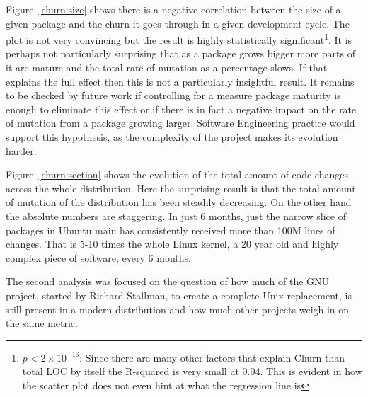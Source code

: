 \documentclass[11pt]{article}
\begin{document}
Figure~\ref{churn:size} shows there is a negative correlation between the size of a given package and the churn it goes through in a given development cycle. The plot is not very convincing but the result is highly statistically significant\footnote{$p < 2 \times 10^{-16}$; Since there are many other factors that explain Churn than total LOC by itself the R-squared is very small at 0.04. This is evident in how the scatter plot does not even hint at what the regression line is}. It is perhaps not particularly surprising that as a package grows bigger more parts of it are mature and the total rate of mutation as a percentage slows. If that explains the full effect then this is not a particularly insightful result. It remains to be checked by future work if controlling for a measure package maturity is enough to eliminate this effect or if there is in fact a negative impact on the rate of mutation from a package growing larger. Software Engineering practice would support this hypothesis, as the complexity of the project makes its evolution harder.

Figure~\ref{churn:section} shows the evolution of the total amount of code changes across the whole distribution. Here the surprising result is that the total amount of mutation of the distribution has been steadily decreasing. On the other hand the absolute numbers are staggering. In just 6 months, just the narrow slice of packages in Ubuntu main has consistently received more than 100M lines of changes. That is 5-10 times the whole Linux kernel, a 20 year old and highly complex piece of software, every 6 months.

The second analysis was focused on the question of how much of the GNU project, started by Richard Stallman, to create a complete Unix replacement, is still present in a modern distribution\cite{gnuinlinux} and how much other projects weigh in on the same metric.
\end{document}
